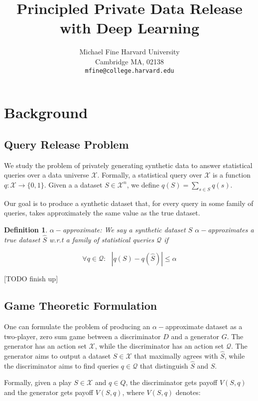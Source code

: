 \documentclass[]{article}
\author{%
  Michael Fine
  Harvard University\\
  Cambridge MA, 02138 \\
  \texttt{mfine@college.harvard.edu} 
}
\title{Principled Private Data Release with Deep Learning}
\newcommand{\X}{\mathcal{X}}
\newcommand{\Q}{\mathcal{Q}}
\newcommand{\B}{\{0,1\}}
\newtheorem{definition}{Definition}
\begin{document}
\maketitle



\section{Background}

\subsection{Query Release Problem}

We study the problem of privately generating synthetic data to answer statistical queries over a data universe $\X$. Formally, a statistical query over $\X$ is a function $q: \X \to \B$. Given a a dataset $S \in \X^n$, we define $q(S) = \sum_{s\in S} q(s)$.

Our goal is to produce a synthetic dataset that, for every query in some family of queries, takes approximately the same value as the true dataset.

\begin{definition}{$\alpha-$approximate:}
    We say a synthetic dataset $S$ $\alpha-$approximates a true dataset $\hat S$ w.r.t a family of statistical queries $\Q$ if

    \begin{equation}
        \forall q \in \Q: ~~~ |q(S) - q(\hat S)| \leq \alpha
    \end{equation}
\end{definition}

[TODO finish up]

\subsection{Game Theoretic Formulation}

One can formulate the problem of producing an $\alpha-$approximate dataset as a two-player, zero sum game \cite{HRU13} between a discriminator $D$ and a generator $G$. The generator has an action set $\X$, while the discriminator has an action set $\Q$. The generator aims to output a dataset $S \in \X$ that maximally agrees with $\hat S$, while the discriminator aims to find queries $q \in \Q$ that distinguish $\hat S$ and $S$.

Formally, given a play $S \in \X$ and $q \in Q$, the discriminator gets payoff $V(S,q)$ and the generator gets payoff $V(S,q)$, where $V(S,q)$ denotes:
\end{document}

